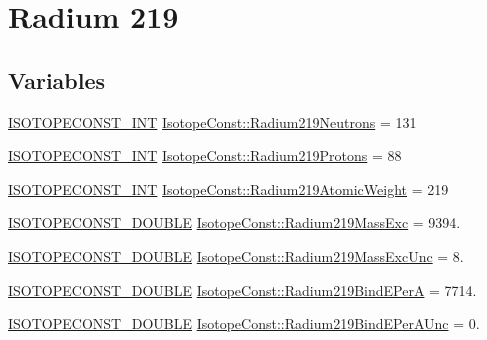 \hypertarget{group___isotope_const-_radium-_ra219}{}\section{Radium 219}
\label{group___isotope_const-_radium-_ra219}
\subsection*{Variables}
\begin{DoxyCompactItemize}
\item 
\mbox{\hyperlink{group___isotope_const-_macros_ga5f18360b3e99483a35c32d789e62621c}{I\+S\+O\+T\+O\+P\+E\+C\+O\+N\+S\+T\+\_\+\+I\+NT}} \mbox{\hyperlink{group___isotope_const-_radium-_ra219_ga2f6271c7a95ff12c92d11d4353ac13df}{Isotope\+Const\+::\+Radium219\+Neutrons}} = 131
\item 
\mbox{\hyperlink{group___isotope_const-_macros_ga5f18360b3e99483a35c32d789e62621c}{I\+S\+O\+T\+O\+P\+E\+C\+O\+N\+S\+T\+\_\+\+I\+NT}} \mbox{\hyperlink{group___isotope_const-_radium-_ra219_ga613e40f145750217e90b1135d374c75a}{Isotope\+Const\+::\+Radium219\+Protons}} = 88
\item 
\mbox{\hyperlink{group___isotope_const-_macros_ga5f18360b3e99483a35c32d789e62621c}{I\+S\+O\+T\+O\+P\+E\+C\+O\+N\+S\+T\+\_\+\+I\+NT}} \mbox{\hyperlink{group___isotope_const-_radium-_ra219_ga3a59efbcb59ad7f2f25193294b0997e3}{Isotope\+Const\+::\+Radium219\+Atomic\+Weight}} = 219
\item 
\mbox{\hyperlink{group___isotope_const-_macros_ga8f45a7272ce02c0b4c65c44636ed719a}{I\+S\+O\+T\+O\+P\+E\+C\+O\+N\+S\+T\+\_\+\+D\+O\+U\+B\+LE}} \mbox{\hyperlink{group___isotope_const-_radium-_ra219_ga46c4b0e2b11ab146ac19c9260b33c453}{Isotope\+Const\+::\+Radium219\+Mass\+Exc}} = 9394.
\item 
\mbox{\hyperlink{group___isotope_const-_macros_ga8f45a7272ce02c0b4c65c44636ed719a}{I\+S\+O\+T\+O\+P\+E\+C\+O\+N\+S\+T\+\_\+\+D\+O\+U\+B\+LE}} \mbox{\hyperlink{group___isotope_const-_radium-_ra219_gae82e3cc79cf1c9f65661624adcbd348e}{Isotope\+Const\+::\+Radium219\+Mass\+Exc\+Unc}} = 8.
\item 
\mbox{\hyperlink{group___isotope_const-_macros_ga8f45a7272ce02c0b4c65c44636ed719a}{I\+S\+O\+T\+O\+P\+E\+C\+O\+N\+S\+T\+\_\+\+D\+O\+U\+B\+LE}} \mbox{\hyperlink{group___isotope_const-_radium-_ra219_ga224ef396654f9ddd84879fcb758cb27f}{Isotope\+Const\+::\+Radium219\+Bind\+E\+PerA}} = 7714.
\item 
\mbox{\hyperlink{group___isotope_const-_macros_ga8f45a7272ce02c0b4c65c44636ed719a}{I\+S\+O\+T\+O\+P\+E\+C\+O\+N\+S\+T\+\_\+\+D\+O\+U\+B\+LE}} \mbox{\hyperlink{group___isotope_const-_radium-_ra219_ga9d7787b0d29010061930020253415b08}{Isotope\+Const\+::\+Radium219\+Bind\+E\+Per\+A\+Unc}} = 0.

\end{DoxyCompactItemize}
